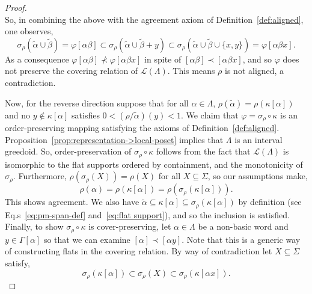 \documentclass[11pt]{article}
\newcommand{\univ}{\Sigma}
\newcommand{\glang}{\Lambda}
\providecommand{\L}{}
\renewcommand{\L}{\mathscr{L}}
\begin{document}
\begin{proof}
\[    \]
    So, in combining the above with the agreement axiom of Definition~\ref{def:aligned}, one observes,
    \[
        \sigma_\rho(\widetilde{\alpha}\cup\widetilde{\beta}) = \varphi[\alpha\beta] \subset \sigma_\rho(\widetilde{\alpha}\cup\widetilde{\beta} + y) \subset \sigma_\rho(\widetilde{\alpha}\cup\widetilde{\beta} \cup \{x, y\}) = \varphi[\alpha\beta x].
    \]
    As a consequence $\varphi[\alpha\beta] \not\prec \varphi[\alpha\beta x]$ in spite of $[\alpha\beta] \prec [\alpha\beta x]$, and so $\varphi$ does not preserve the covering relation of $\L(\glang)$.
    This means $\rho$ is not aligned, a contradiction.

    Now, for the reverse direction suppose that for all $\alpha \in \glang$, $\rho(\widetilde{\alpha}) = \rho(\kappa[\alpha])$ and no $y \notin \kappa[\alpha]$ satisfies $0 < (\rho/\widetilde{\alpha})(y) < 1$.
    We claim that $\varphi = \sigma_\rho \circ \kappa$ is an order-preserving mapping satisfying the axioms of Definition~\ref{def:aligned}.
    Proposition~\ref{prop:representation->local-poset} implies that $\glang$ is an interval greedoid.
    So, order-preservation of $\sigma_\rho\circ\kappa$ follows from the fact that $\L(\glang)$ is isomorphic to the flat supports ordered by containment, and the monotonicity of $\sigma_\rho$.
    Furthermore, $\rho(\sigma_\rho(X)) = \rho(X)$ for all $X\subseteq \univ$, so our assumptions make,
    \[ \rho(\alpha) = \rho(\kappa[\alpha]) = \rho(\sigma_\rho(\kappa[\alpha])). \]
    This shows agreement.
    We also have $\widetilde{\alpha}\subseteq\kappa[\alpha]\subseteq\sigma_\rho(\kappa[\alpha])$ by definition (see Eq.s~\ref{eq:pm-span-def} and~\ref{eq:flat support}), and so the inclusion is satisfied.
    Finally, to show $\sigma_\rho \circ \kappa$ is cover-preserving, let $\alpha \in \glang$ be a non-basic word and $y \in \Gamma[\alpha]$ so that we can examine $[\alpha] \prec [\alpha y]$.
    Note that this is a generic way of constructing flats in the covering relation.
    By way of contradiction let $X\subseteq\univ$ satisfy,
    \begin{equation}\label{eq:igu}
        \sigma_\rho(\kappa[\alpha]) \subset \sigma_\rho(X) \subset \sigma_\rho(\kappa[\alpha x]).
    \end{equation}

\end{proof}
\end{document}
